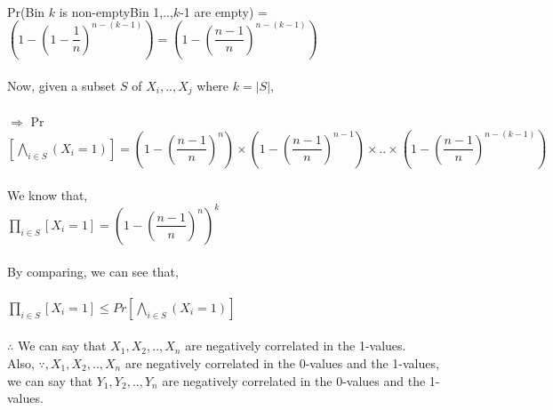 \documentclass{article}
\begin{document}
\\
Pr(Bin $k$ is non-empty\textbar Bin 1,..,$k$-1 are empty) = $\left(1-\left(1-\dfrac{1}{n}\right)^{n-(k-1)}\right) = \left(1-\left(\dfrac{n-1}{n}\right)^{n-(k-1)}\right)$\\
\\
Now, given a subset $S$ of $X_{i}, .., X_{j}$ where $k = |S|$, \\
\\$\Rightarrow$ Pr$\left[\bigwedge\limits_{i \in S}(X_{i} = 1)\right] = \left(1-\left(\dfrac{n-1}{n}\right)^n\right) \times 
\left(1-\left(\dfrac{n-1}{n}\right)^{n-1}\right) \times .. \times \left(1-\left(\dfrac{n-1}{n}\right)^{n-(k-1)}\right) 
$\\
\\
We know that, \\
$\prod\limits_{i \in S}\left[X_{i} = 1\right] = \left(1-\left(\dfrac{n-1}{n}\right)^n\right)^{k} $\\
\\
By comparing, we can see that,\\
\\
$\prod\limits_{i \in S}\left[X_{i} = 1\right] \le Pr\left[\bigwedge\limits_{i \in S}(X_{i} = 1)\right]$ \\
\\
$\therefore $ We can say that $X_{1}, X_{2}, .., X_{n}$ are negatively correlated in the 1-values.
\\
Also, $\because, X_{1}, X_{2}, .., X_{n}$ are negatively correlated in the 0-values and the 1-values, 
we can say that $Y_{1}, Y_{2}, .., Y_{n}$ are negatively correlated in the 0-values and the 1-values.
\end{document}
